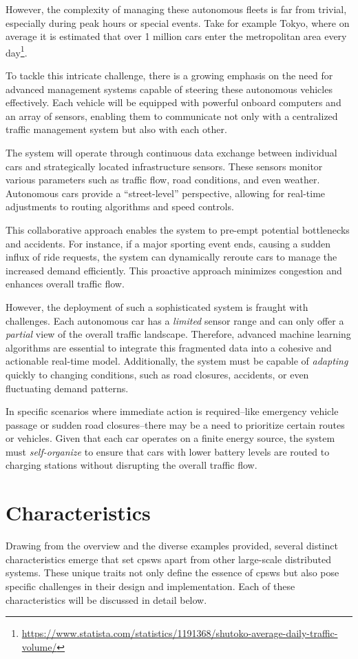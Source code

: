 However, the complexity of managing these autonomous fleets is far from trivial, 
 especially during peak hours or special events. 
%
Take for example Tokyo,
 where on average it is estimated that
 over 1 million cars enter the metropolitan area every day\footnote{\url{https://www.statista.com/statistics/1191368/shutoko-average-daily-traffic-volume/}}.

To tackle this intricate challenge, 
 there is a growing emphasis on the need for advanced management systems capable 
 of steering these autonomous vehicles effectively. 
 Each vehicle will be equipped with powerful onboard computers 
 and an array of sensors, 
 enabling them to communicate not only with a centralized traffic management system 
 but also with each other.

The system will operate through continuous data 
 exchange between individual cars 
 and strategically located infrastructure sensors. 
 These sensors monitor various parameters such as traffic flow, 
 road conditions, and even weather. 
 Autonomous cars provide a ``street-level'' perspective, 
 allowing for real-time adjustments to routing algorithms 
 and speed controls.

This collaborative approach enables the system to pre-empt potential bottlenecks and accidents. 
 For instance, if a major sporting event ends, 
 causing a sudden influx of ride requests, 
 the system can dynamically reroute cars to manage the increased demand efficiently. 
 This proactive approach minimizes congestion and enhances overall traffic flow.

However, the deployment of such a sophisticated system is fraught with challenges. 
 Each autonomous car has a \emph{limited} sensor range and can only offer a \emph{partial} view of the overall traffic landscape. 
 Therefore, advanced machine learning algorithms are essential to integrate this fragmented data into a cohesive and actionable real-time model. 
 Additionally, the system must be capable of \emph{adapting} quickly to changing conditions, such as road closures, accidents, or even fluctuating demand patterns.

In specific scenarios where immediate action is required--like emergency vehicle passage or sudden road closures--there may be a need to prioritize certain routes or vehicles. 
 Given that each car operates on a finite energy source, 
 the system must \emph{self-organize} to ensure that cars with lower battery levels are routed to charging stations without disrupting the overall traffic flow.
\section{Characteristics}
Drawing from the overview and the diverse examples provided, 
 several distinct characteristics emerge that set \acp{cpsw} apart from other large-scale 
 distributed systems. 
% 
These unique traits not only define the essence of \acp{cpsw} but also pose specific challenges in their design and implementation. 
 Each of these characteristics will be discussed in detail below.

